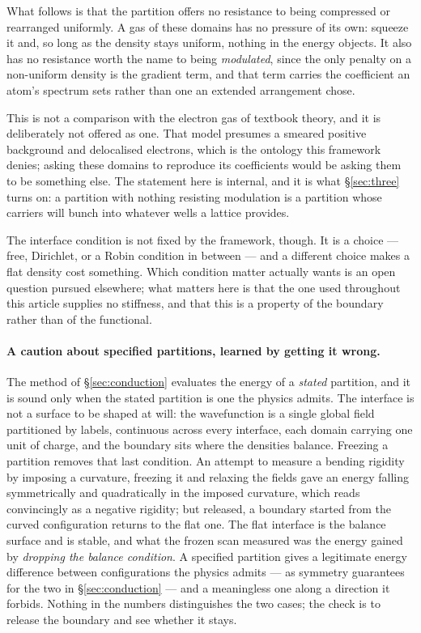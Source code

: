 \documentclass[11pt]{article}
\begin{document}
What follows is that the partition offers no resistance to being compressed or rearranged uniformly.
A gas of these domains has no pressure of its own: squeeze it and, so long as the density stays
uniform, nothing in the energy objects. It also has no resistance worth the name to being
\emph{modulated}, since the only penalty on a non-uniform density is the gradient term, and that term
carries the coefficient an atom's spectrum sets rather than one an extended arrangement chose.

This is not a comparison with the electron gas of textbook theory, and it is deliberately not
offered as one. That model presumes a smeared positive background and delocalised electrons, which is
the ontology this framework denies; asking these domains to reproduce its coefficients would be
asking them to be something else. The statement here is internal, and it is what \S\ref{sec:three}
turns on: a partition with nothing resisting modulation is a partition whose carriers will bunch into
whatever wells a lattice provides.

The interface condition is not fixed by the framework, though. It is a choice --- free, Dirichlet, or
a Robin condition in between --- and a different choice makes a flat density cost something. Which
condition matter actually wants is an open question pursued elsewhere; what matters here is that the
one used throughout this article supplies no stiffness, and that this is a property of the boundary
rather than of the functional.

\paragraph{A caution about specified partitions, learned by getting it wrong.} The method of
\S\ref{sec:conduction} evaluates the energy of a \emph{stated} partition, and it is sound only when
the stated partition is one the physics admits. The interface is not a surface to be shaped at
will: the wavefunction is a single global field partitioned by labels, continuous across every
interface, each domain carrying one unit of charge, and the boundary sits where the densities
balance. Freezing a partition removes that last condition. An attempt to measure a bending rigidity
by imposing a curvature, freezing it and relaxing the fields gave an energy falling symmetrically
and quadratically in the imposed curvature, which reads convincingly as a negative rigidity; but
released, a boundary started from the curved configuration returns to the flat one. The flat
interface is the balance surface and is stable, and what the frozen scan measured was the energy
gained by \emph{dropping the balance condition}. A specified partition gives a legitimate energy
difference between configurations the physics admits --- as symmetry guarantees for the two in
\S\ref{sec:conduction} --- and a meaningless one along a direction it forbids. Nothing in the
numbers distinguishes the two cases; the check is to release the boundary and see whether it stays.
\end{document}
